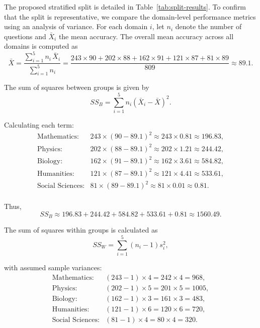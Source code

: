 \documentclass{svproc}
\begin{document}
The proposed stratified split is detailed in Table~\ref{tab:split-results}. To confirm that the split is representative, we compare the domain-level performance metrics using an analysis of variance. For each domain \(i\), let \(n_i\) denote the number of questions and \(\bar{X}_i\) the mean accuracy. The overall mean accuracy across all domains is computed as
\begin{equation}
  \bar{X} = \frac{\sum_{i=1}^{5} n_i\, \bar{X}_i}{\sum_{i=1}^{5} n_i}
  = \frac{243 \times 90 + 202 \times 88 + 162 \times 91 + 121 \times 87 + 81 \times 89}{809} \approx 89.1.
\end{equation}

The sum of squares between groups is given by
\begin{equation}
  SS_B = \sum_{i=1}^{5} n_i \left( \bar{X}_i - \bar{X} \right)^2.
\end{equation}

Calculating each term:
\[
\begin{array}{ll}
\text{Mathematics:} & 243 \times (90 - 89.1)^2 \approx 243 \times 0.81 \approx 196.83, \\
\text{Physics:}     & 202 \times (88 - 89.1)^2 \approx 202 \times 1.21 \approx 244.42, \\
\text{Biology:}     & 162 \times (91 - 89.1)^2 \approx 162 \times 3.61 \approx 584.82, \\
\text{Humanities:}  & 121 \times (87 - 89.1)^2 \approx 121 \times 4.41 \approx 533.61, \\
\text{Social Sciences:} & 81 \times (89 - 89.1)^2 \approx 81 \times 0.01 \approx 0.81. \\
\end{array}
\]

Thus,
\begin{equation}
  SS_B \approx 196.83 + 244.42 + 584.82 + 533.61 + 0.81 \approx 1560.49.
\end{equation}

The sum of squares within groups is calculated as
\begin{equation}
  SS_W = \sum_{i=1}^{5} (n_i - 1) s_i^2,
\end{equation}

with assumed sample variances:
\[
\begin{array}{ll}
\text{Mathematics:} & (243-1) \times 4 = 242 \times 4 = 968, \\
\text{Physics:}     & (202-1) \times 5 = 201 \times 5 = 1005, \\
\text{Biology:}     & (162-1) \times 3 = 161 \times 3 = 483, \\
\text{Humanities:}  & (121-1) \times 6 = 120 \times 6 = 720, \\
\text{Social Sciences:} & (81-1) \times 4 = 80 \times 4 = 320. \\
\end{array}
\]
\end{document}

